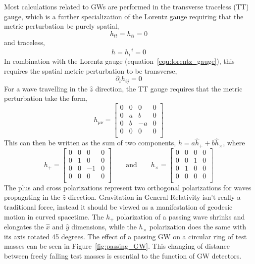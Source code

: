 Most calculations related to GWs are performed in the transverse traceless (TT) gauge, which is a further specialization of the Lorentz gauge requiring that the metric perturbation be purely spatial,
\begin{equation}
    h_{tt} = h_{ti} = 0
\end{equation}
and traceless,
\begin{equation}
    h = h_{i}^{\;\;i} = 0
\end{equation}
In combination with the Lorentz gauge (equation~\ref{equ:lorentz_gauge}), this requires the spatial metric perturbation to be transverse,
\begin{equation}
    \partial_{i}h_{ij} = 0
\end{equation}
For a wave travelling in the $\hat{z}$ direction, the TT gauge requires that the metric perturbation take the form,
\begin{equation}
    h_{\mu\nu} = 
    \begin{bmatrix} 
    0 & 0 & 0 & 0 \\
    0 & a & b & 0 \\
    0 & b & -a & 0 \\
    0 & 0 & 0 & 0 \\
    \end{bmatrix}
\end{equation}
This can then be written as the sum of two components, $h = a\hat{h}_{+} + b\hat{h}_{\times}$, where
\begin{equation}
    h_{+} = 
    \begin{bmatrix} 
    0 & 0 & 0 & 0 \\
    0 & 1 & 0 & 0 \\
    0 & 0 & -1 & 0 \\
    0 & 0 & 0 & 0 \\
    \end{bmatrix} \quad\quad \text{and} \quad\quad
    h_{\times} = 
    \begin{bmatrix} 
    0 & 0 & 0 & 0 \\
    0 & 0 & 1 & 0 \\
    0 & 1 & 0 & 0 \\
    0 & 0 & 0 & 0 \\
    \end{bmatrix}
\end{equation}
The plus and cross polarizations represent two orthogonal polarizations for waves propagating in the $\hat{z}$ direction. Gravitation in General Relativity isn't really a traditional force, instead it should be viewed as a manifestation of geodesic motion in curved spacetime. The $h_{+}$ polarization of a passing wave shrinks and elongates the $\hat{x}$ and $\hat{y}$ dimensions, while the $h_{\times}$ polarization does the same with its axis rotated 45 degrees. The effect of a passing GW on a circular ring of test masses can be seen in Figure~\ref{fig:passing_GW}. This changing of distance between freely falling test masses is essential to the function of GW detectors.

